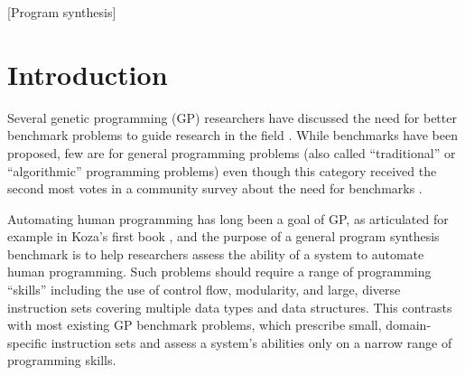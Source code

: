 \documentclass{sig-alternate}
\begin{document}
[Program synthesis]




\section{Introduction}

Several genetic programming (GP) researchers have discussed the need for better benchmark problems to guide research in the field \cite{McDermott:2012:GECCO, White:2013:BGB:2441218.2441242}. While benchmarks have been proposed, few are for general programming problems (also called ``traditional'' or ``algorithmic'' programming problems) even though this category received the second most votes in a community survey about the need for benchmarks \cite{White:2013:BGB:2441218.2441242}. 


Automating human programming has long been a goal of GP, as articulated for example in Koza's first book \cite{koza:book}, and the purpose of a general program synthesis benchmark is to help researchers assess the ability of a system to automate human programming. Such problems should require a range of programming ``skills'' including the use of control flow, modularity, and large, diverse instruction sets covering multiple data types and data structures. This contrasts with most existing GP benchmark problems, which prescribe small, domain-specific instruction sets and assess a system's abilities only on a narrow range of programming skills.
\end{document}
